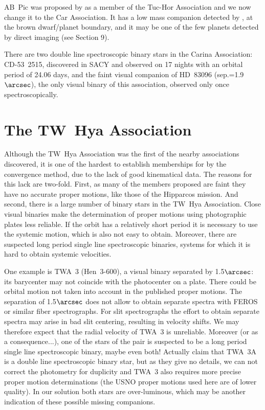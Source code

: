 \documentclass[11pt,twoside]{book}
\begin{document}
AB~Pic was proposed by \citet{song03} as a member of the Tuc-Hor Association
and we now change it to the Car Association.
It has a low mass companion detected by \citet{chauvin05c},
at the  brown dwarf/planet boundary,
and it may be one of the few planets detected by direct imaging (see Section 9).

There are two double line spectroscopic binary stars in the
{Carina Association}: CD-53~2515,
discovered in SACY and observed on 17 nights with an orbital period of
24.06 days,
and the faint visual companion of HD~83096
(sep.=1.9$\arcsec$), the only visual binary of this association,
observed only once spectroscopically.


\section{The TW~Hya Association}


Although the TW~Hya Association was the first of the nearby associations
discovered, it is one of the hardest to establish memberships for by
the convergence method, due to the lack of good kinematical data.
The reasons for this lack are two-fold.
First, as many of the members proposed are faint they have no accurate
proper motions, like those of the Hipparcos mission.
And second, there is a large number of binary stars in  the TW~Hya Association.
Close visual binaries make the determination of proper motions using
photographic plates less reliable.
If the orbit has a relatively short period it is necessary to use the systemic motion,
which is also not easy to obtain.
Moreover, there are suspected long period single line spectroscopic
binaries, systems for which it is hard to obtain  systemic velocities.

One example is TWA~3 (Hen~3-600), a visual binary separated by 1.5$\arcsec$:
its barycenter may not coincide with the photocenter on a plate.
There could be orbital motion not taken into account in the published proper motions.
The separation of 1.5$\arcsec$ does not allow to obtain separate spectra
with FEROS or similar fiber spectrographs.
For slit spectrographs the effort to obtain separate spectra may arise in bad slit
centering, resulting in velocity shifts.
We may therefore expect that the radial velocity of TWA~3 is unreliable.
Moreover (or as a consequence...), one of the stars of the pair  is suspected to be a long period
single line spectroscopic binary, maybe even both!
Actually \citet{Ray06} claim that TWA~3A is a double line spectroscopic binary
star, but as they give no details, we can not correct the photometry for duplicity and
TWA~3 also requires  more precise
proper motion determinations (the USNO proper motions used here are of lower quality).
In our solution both stars are over-luminous, which may be another indication of these
possible missing companions.
\end{document}
